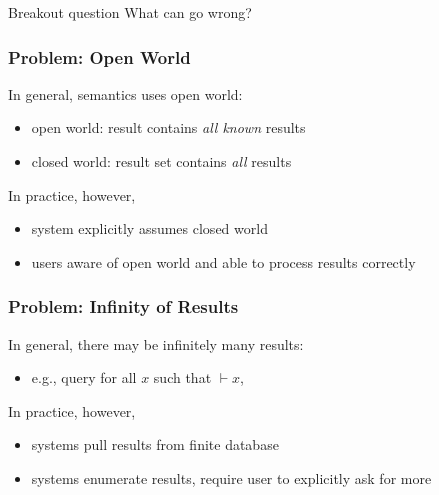 \begin{frame}{Breakout question}
What can go wrong?
\end{frame}

\begin{frame}\frametitle{Problem: Open World}
In general, semantics uses open world:
\begin{itemize}
\item open world: result contains \emph{all known} results
\item closed world: result set contains \emph{all} results
\end{itemize}

In practice, however,
\begin{itemize}
\item system explicitly assumes closed world
\item users aware of open world and able to process results correctly
\end{itemize}
\end{frame}

\begin{frame}\frametitle{Problem: Infinity of Results}
In general, there may be infinitely many results:
\begin{itemize}
\item e.g., query for all $x$ such that $\vdash x$,
\end{itemize}

In practice, however,
\begin{itemize}
\item systems pull results from finite database 
\item systems enumerate results, require user to explicitly ask for more 
\end{itemize}
\end{frame}

